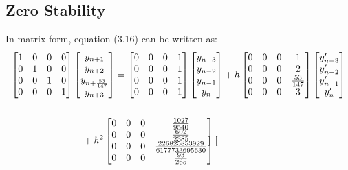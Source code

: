 \documentclass[12pt]{report}
\begin{document}
\subsection{Zero Stability}
In matrix form, equation (3.16) can be written as:
\begin{align}
\begin{split}
\begin{bmatrix}
1 & 0 & 0 & 0\\
0 & 1 & 0 & 0\\
0 & 0 & 1 & 0\\
0 & 0 & 0 & 1
\end{bmatrix}
\begin{bmatrix}
y_{n+1}\\ y_{n+2} \\ y_{n+\frac{53}{147}} \\ y_{n+3}
\end{bmatrix}
&=\begin{bmatrix}
0 & 0 & 0 & 1\\
0 & 0 & 0 & 1\\
0 & 0 & 0 & 1\\
0 & 0 & 0 & 1
\end{bmatrix}\begin{bmatrix}
y_{n-3}\\ y_{n-2} \\ y_{n-1} \\ y_{n}
\end{bmatrix}
+h
\begin{bmatrix}
0 & 0 & 0 & 1\\
0 & 0 & 0 & 2\\
0 & 0 & 0 & \frac{53}{147}\\
0 & 0 & 0 & 3
\end{bmatrix}\begin{bmatrix}
y'_{n-3}\\ y'_{n-2} \\ y'_{n-1} \\ y'_{n}
\end{bmatrix}\\\\
&\hspace{-12mm}
+h^{2}\begin{bmatrix}
0 & 0 & 0 & \frac{1027}{9540}\\
0 & 0 & 0 & \frac{602}{2385}\\
0 & 0 & 0 & \frac{226825853929}{6177733695630}\\
0 & 0 & 0 & \frac{93}{265}
\end{bmatrix}\begin{bmatrix}

\end{bmatrix}
\end{split}
\end{align}
\end{document}
